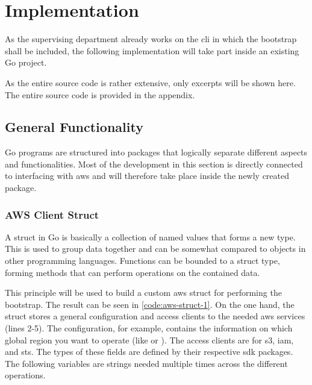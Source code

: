 \chapter{Implementation}
As the supervising department already works on the \ac{cli} in which the bootstrap shall be included, the following implementation will take part inside an existing Go project.

As the entire source code is rather extensive, only excerpts will be shown here.
The entire source code is provided in the appendix.

\section{General Functionality}
Go programs are structured into packages that logically separate different aspects and functionalities.
Most of the development in this section is directly connected to interfacing with \ac{aws} and will therefore take place inside the newly created  package.

\subsection{AWS Client Struct}
A struct in Go is basically a collection of named values that forms a new type.
This is used to group data together and can be somewhat compared to objects in other programming languages.
Functions can be bounded to a struct type, forming methods that can perform operations on the contained data.

This principle will be used to build a custom \ac{aws} struct for performing the bootstrap.
The result can be seen in \autoref{code:aws-struct-1}.
On the one hand, the struct stores a general configuration and access clients to the needed \ac{aws} services (lines 2-5).
The configuration, for example, contains the information on which global region you want to operate (like  or ).
The access clients are for \ac{s3}, \ac{iam}, and \ac{sts}.
The types of these fields are defined by their respective \ac{sdk} packages.
The following variables are strings needed multiple times across the different operations.



